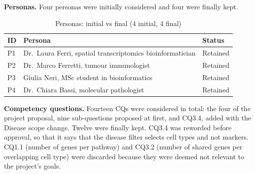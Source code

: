 \medskip\noindent\textbf{Personas.} Four personas were initially considered and four were finally kept. 

\begin{table}[htbp]
\centering
\small
\begin{tabularx}{\linewidth}{|l|X|l|}
\hline
\textbf{ID} & \textbf{Persona} & \textbf{Status} \\ \hline
P1 & Dr.\ Laura Ferri, spatial transcriptomics bioinformatician & Retained \\ \hline
P2 & Dr.\ Marco Ferretti, tumour immunologist & Retained \\ \hline
P3 & Giulia Neri, MSc student in bioinformatics & Retained \\ \hline
P4 & Dr.\ Chiara Bassi, molecular pathologist & Retained \\ \hline
\end{tabularx}
\caption{Personas: initial vs final (4 initial, 4 final)}
\end{table}

\medskip\noindent\textbf{Competency questions.} Fourteen CQs were considered in total: the four of the project proposal, nine sub-questions proposed at first, and CQ3.4, added with the Disease scope change. Twelve were finally kept. CQ3.4 was reworded before approval, so that it says that the disease filter selects cell types and not markers. CQ1.1 (number of genes per pathway) and CQ3.2 (number of shared genes per overlapping cell type) were discarded because they were deemed not relevant to the project's goals.

